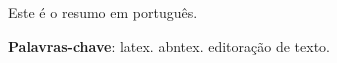 \setlength{\absparsep}{18pt} %
\begin{resumo}
 Este é o resumo em português.

 \textbf{Palavras-chave}: latex. abntex. editoração de texto.
\end{resumo}